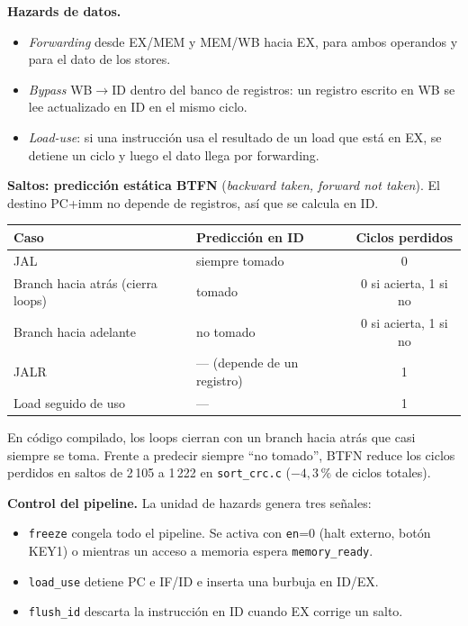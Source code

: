 \documentclass[11pt,a4paper]{article}
\newcommand{\code}[1]{\texttt{#1}}
\begin{document}
\textbf{Hazards de datos.}
\begin{itemize}
\item \emph{Forwarding} desde EX/MEM y MEM/WB hacia EX, para ambos operandos y para el dato de los stores.
\item \emph{Bypass} WB$\to$ID dentro del banco de registros: un registro escrito en WB se lee actualizado en ID en el mismo ciclo.
\item \emph{Load-use}: si una instrucción usa el resultado de un load que está en EX, se detiene un ciclo y luego el dato llega por forwarding.
\end{itemize}

\textbf{Saltos: predicción estática BTFN} (\emph{backward taken, forward not taken}). El destino PC+imm no depende de registros, así que se calcula en ID.

\begin{center}
\begin{tabular}{llc}
\toprule
Caso & Predicción en ID & Ciclos perdidos \\
\midrule
JAL & siempre tomado & 0 \\
Branch hacia atrás (cierra loops) & tomado & 0 si acierta, 1 si no \\
Branch hacia adelante & no tomado & 0 si acierta, 1 si no \\
JALR & --- (depende de un registro) & 1 \\
Load seguido de uso & --- & 1 \\
\bottomrule
\end{tabular}
\end{center}

En código compilado, los loops cierran con un branch hacia atrás que casi siempre se toma. Frente a predecir siempre ``no tomado'', BTFN reduce los ciclos perdidos en saltos de 2\,105 a 1\,222 en \code{sort\_crc.c} ($-4{,}3\,\%$ de ciclos totales).

\textbf{Control del pipeline.} La unidad de hazards genera tres señales:
\begin{itemize}
\item \code{freeze} congela todo el pipeline. Se activa con \code{en}=0 (halt externo, botón KEY1) o mientras un acceso a memoria espera \code{memory\_ready}.
\item \code{load\_use} detiene PC e IF/ID e inserta una burbuja en ID/EX.
\item \code{flush\_id} descarta la instrucción en ID cuando EX corrige un salto.
\end{itemize}
\end{document}
